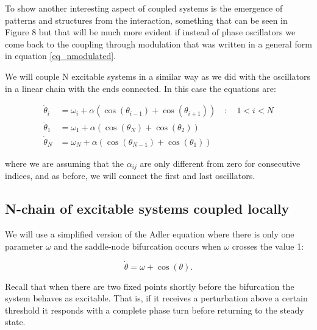 \documentclass{article}
\begin{document}
To show another interesting aspect of coupled systems is the emergence of patterns and structures from the interaction, something that can be seen in Figure 8 but that will be much more evident if instead of phase oscillators we come back to the coupling through modulation that was written in a general form in equation \ref{eq_nmodulated}.

We will couple N excitable systems in a similar way as we did with the oscillators in a linear chain with the ends connected. In this case the equations are:

\begin{subequations} \label{eq_Nexcoupled}
\begin{align} 
    \dot{\theta}_i &= \omega_i + \alpha \left(\cos(\theta_{i-1})+\cos(\theta_{i+1})\right)  \quad : \quad 1<i<N \\
    \dot{\theta}_1 &= \omega_1 + \alpha \left(\cos(\theta_{N})+\cos(\theta_{2})\right) \\
    \dot{\theta}_N &= \omega_N + \alpha \left(\cos(\theta_{N-1})+\cos(\theta_{1})\right) 
\end{align}
\end{subequations}

where we are assuming that the $\alpha_{ij}$ are only different from zero for consecutive indices, and
as before, we will connect the first and last oscillators.

\begin{figure} [h]
    \centerline{}
    \caption{}
    \label{fig_noscmodulated}
\end{figure}

\newpage

\subsection{N-chain of excitable systems coupled locally}


We will use a simplified version of the Adler equation where there is only one parameter $\omega$ and the saddle-node bifurcation occurs when $\omega$ crosses the value 1:

\begin{equation} \label{eq_adlers}
    \dot{\theta} = \omega + \cos(\theta).
\end{equation}

Recall that when there are two fixed points shortly before the bifurcation the system behaves as excitable. That is, if it receives a perturbation above a certain threshold it responds with a complete phase turn before returning to the steady state. 
\end{document}
